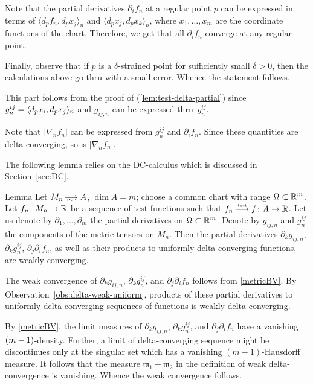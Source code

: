 Note that the partial derivatives $\partial_if_n$ at a regular point $p$ can be expressed in terms of $\langle d_pf_n,d_px_j\rangle_n$ and $\langle d_px_j,d_px_k\rangle_n$, where $x_1,\dots,x_m$ are the coordinate functions of the chart.
Therefore, we get that all $\partial_if_n$ converge at any regular point.

Finally, observe that if $p$ is a $\delta$-strained point for sufficiently small $\delta>0$,
then the calculations above go thru with a small error.
Whence the statement follows.

This part follows from the proof of (\ref{lem:test-delta-partial}) since $g^{ij}_n\zz=\langle d_px_i,d_px_j\rangle_n$ and $g_{ij,n}$ can be expressed thru~$g^{ij}_n$.

Note that $|\nabla_n f_n|$ can be expressed from $g^{ij}_n$ and $\partial_if_n$.
Since these quantities are delta-converging, so is $|\nabla_n f_n|$.
\qeds

The following lemma relies on the DC-calculus which is discussed in Section~\ref{sec:DC}.

\begin{thm}{Lemma}\label{lem:test-delta-partial-g}
Let $M_n\smooths{} A$, $\dim A=m$;
choose a common chart with range $\Omega\subset \mathbb{R}^m$.
Let $f_n\colon M_n\to\mathbb{R}$ be a sequence of test functions such that $f_n\zz\testto f\:A\to \RR$.
Let us denote by $\partial_1,\dots,\partial_m$ the partial derivatives on $\Omega\subset \mathbb{R}^m$.
Denote by $g_{ij,n}$ and $g^{ij}_n$ the components of the metric tensors on $M_n$.
Then  the partial derivatives $\partial_kg_{ij,n}$, $\partial_k g^{ij}_n$,  $\partial_j\partial_if_n$, as well as their products to uniformly delta-converging functions,  are weakly converging.


\end{thm}

The weak convergence of $\partial_kg_{ij,n}$, $\partial_k g^{ij}_n$, and $\partial_j\partial_if_n$
follows from \ref{metricBV}.
By Observation~\ref{obs:delta-weak-uniform}, products of these partial derivatives to uniformly delta-converging sequences of functions is weakly delta-converging.

By \ref{metricBV}, the limit measures of $\partial_kg_{ij,n}$, $\partial_k g^{ij}_n$, and $\partial_j\partial_if_n$ have a vanishing $(m\zz-1)$-density.
Further, a limit of delta-converging sequence might be discontinues only at the singular set which has a vanishing $(m-1)$-Hausdorff measure.
It follows that the measure $\mathfrak{m}_1-\mathfrak{m}_2$ in the definition of weak delta-convergence is vanishing. 
Whence the weak convergence follows.
\qeds

